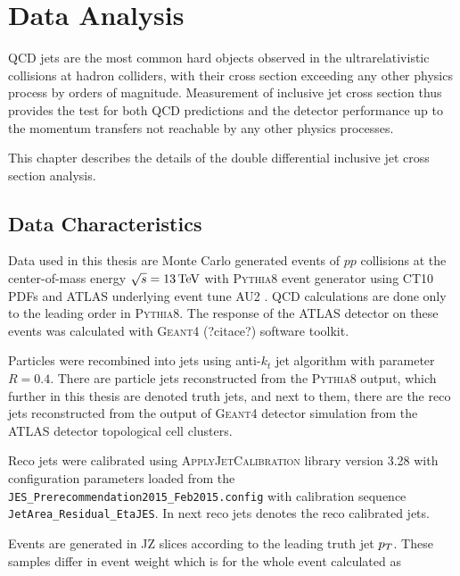 \chapter{Data Analysis}


QCD jets are the most common hard objects observed in the ultrarelativistic
collisions at hadron colliders, with their cross section exceeding any other
physics process by orders of magnitude.  Measurement of inclusive jet cross
section thus provides the test for both QCD predictions and the detector
performance up to the momentum transfers not reachable by any other physics
processes. 

This chapter describes the details of the double differential inclusive jet
cross section analysis.

\section{Data Characteristics}

Data used in this thesis are Monte Carlo generated events of $pp$ collisions at
the center-of-mass energy $\sqrt{s} = 13\,\text{TeV}$ with \textsc{Pythia8}
\cite{Pythia8} event generator using CT10 PDFs \cite{CT10PDF} and ATLAS underlying event
tune AU2 \cite{AU2}. QCD calculations are done only to the leading order in
\textsc{Pythia8}. The response of the ATLAS detector on these events was
calculated with \textsc{Geant4} (?citace?) software toolkit.

Particles were recombined into jets using anti-$k_t$ jet algorithm with parameter $R=0.4$.
There are particle jets reconstructed from the \textsc{Pythia8} output, which
further in this thesis are denoted truth jets, and next to them, there are the
reco jets reconstructed from the output of \textsc{Geant4} detector
simulation from the ATLAS detector topological cell clusters. 

Reco jets were calibrated using \textsc{ApplyJetCalibration}
\cite{ApplyJetCalibration} library version 3.28 with configuration parameters
loaded from the \texttt{JES\_Prerecommendation2015\_Feb2015.config} with
calibration sequence \texttt{JetArea\_Residual\_EtaJES}. In next reco jets
denotes the reco calibrated jets.

Events are generated in JZ slices according to 
the leading truth jet $p_{T}$. These samples differ in event weight which is for
the whole event calculated as 

